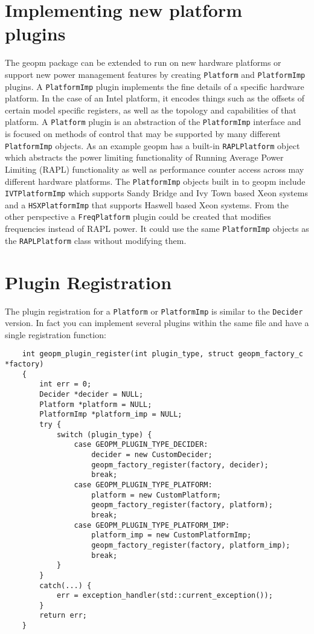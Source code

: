 \documentclass[11pt]{article}
\begin{document}
\section{Implementing new platform plugins}
The geopm package can be extended to run on new hardware platforms or
support new power management features by creating \verb#Platform# and
\verb#PlatformImp# plugins. A \verb#PlatformImp# plugin implements the
fine details of a specific hardware platform. In the case of an Intel
platform, it encodes things such as the offsets of certain model
specific registers, as well as the topology and capabilities of that
platform. A \verb#Platform# plugin is an abstraction of the
\verb#PlatformImp# interface and is focused on methods of control that
may be supported by many different \verb#PlatformImp# objects. As an
example geopm has a built-in \verb#RAPLPlatform# object which
abstracts the power limiting functionality of Running Average Power
Limiting (RAPL) functionality as well as performance counter access
across may different hardware platforms. The \verb#PlatformImp#
objects built in to geopm include \verb#IVTPlatformImp# which supports
Sandy Bridge and Ivy Town based Xeon systems and a
\verb#HSXPlatformImp# that supports Haswell based Xeon systems. From
the other perspective a \verb#FreqPlatform# plugin could be created
that modifies frequencies instead of RAPL power. It could use the same
\verb#PlatformImp# objects as the \verb#RAPLPlatform# class without
modifying them.

\section{Plugin Registration}
The plugin registration for a \verb#Platform# or \verb#PlatformImp# is
similar to the \verb#Decider# version. In fact you can implement
several plugins within the same file and have a single registration
function:
\begin{verbatim}
    int geopm_plugin_register(int plugin_type, struct geopm_factory_c *factory)
    {
        int err = 0;
        Decider *decider = NULL;
        Platform *platform = NULL;
        PlatformImp *platform_imp = NULL;
        try {
            switch (plugin_type) {
                case GEOPM_PLUGIN_TYPE_DECIDER:
                    decider = new CustomDecider;
                    geopm_factory_register(factory, decider);
                    break;
                case GEOPM_PLUGIN_TYPE_PLATFORM:
                    platform = new CustomPlatform;
                    geopm_factory_register(factory, platform);
                    break;
                case GEOPM_PLUGIN_TYPE_PLATFORM_IMP:
                    platform_imp = new CustomPlatformImp;
                    geopm_factory_register(factory, platform_imp);
                    break;
            }
        }
        catch(...) {
            err = exception_handler(std::current_exception());
        }
        return err;
    }
\end{verbatim}
\end{document}
